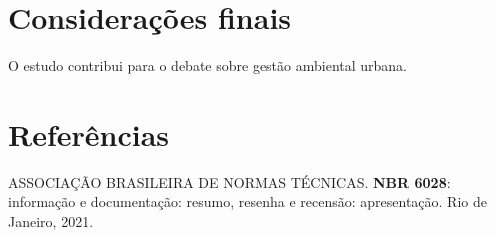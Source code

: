 \documentclass{abnt-trabalho-academico}
\begin{document}
\chapter{Considerações finais}

O estudo contribui para o debate sobre gestão ambiental urbana.

\postextual

\chapter*{Referências}

ASSOCIAÇÃO BRASILEIRA DE NORMAS TÉCNICAS. \textbf{NBR 6028}: informação e
documentação: resumo, resenha e recensão: apresentação. Rio de Janeiro, 2021.
\end{document}
